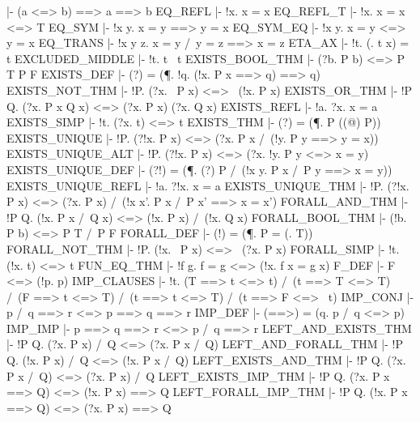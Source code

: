   |- (a <=> b) ==> a ==> b
\ENDTHEOREM
\THEOREM EQ\_REFL
  |- !x. x = x
\ENDTHEOREM
\THEOREM EQ\_REFL\_T
  |- !x. x = x <=> T
\ENDTHEOREM
\THEOREM EQ\_SYM
  |- !x y. x = y ==> y = x
\ENDTHEOREM
\THEOREM EQ\_SYM\_EQ
  |- !x y. x = y <=> y = x
\ENDTHEOREM
\THEOREM EQ\_TRANS
  |- !x y z. x = y /\ y = z ==> x = z
\ENDTHEOREM
\THEOREM ETA\_AX
  |- !t. (\x. t x) = t
\ENDTHEOREM
\THEOREM EXCLUDED\_MIDDLE
  |- !t. t \/ ~t
\ENDTHEOREM
\THEOREM EXISTS\_BOOL\_THM
  |- (?b. P b) <=> P T \/ P F
\ENDTHEOREM
\THEOREM EXISTS\_DEF
  |- (?) = (\P. !q. (!x. P x ==> q) ==> q)
\ENDTHEOREM
\THEOREM EXISTS\_NOT\_THM
  |- !P. (?x. ~P x) <=> ~(!x. P x)
\ENDTHEOREM
\THEOREM EXISTS\_OR\_THM
  |- !P Q. (?x. P x \/ Q x) <=> (?x. P x) \/ (?x. Q x)
\ENDTHEOREM
\THEOREM EXISTS\_REFL
  |- !a. ?x. x = a
\ENDTHEOREM
\THEOREM EXISTS\_SIMP
  |- !t. (?x. t) <=> t
\ENDTHEOREM
\THEOREM EXISTS\_THM
  |- (?) = (\P. P ((@) P))
\ENDTHEOREM
\THEOREM EXISTS\_UNIQUE
  |- !P. (?!x. P x) <=> (?x. P x /\ (!y. P y ==> y = x))
\ENDTHEOREM
\THEOREM EXISTS\_UNIQUE\_ALT
  |- !P. (?!x. P x) <=> (?x. !y. P y <=> x = y)
\ENDTHEOREM
\THEOREM EXISTS\_UNIQUE\_DEF
  |- (?!) = (\P. (?) P /\ (!x y. P x /\ P y ==> x = y))
\ENDTHEOREM
\THEOREM EXISTS\_UNIQUE\_REFL
  |- !a. ?!x. x = a
\ENDTHEOREM
\THEOREM EXISTS\_UNIQUE\_THM
  |- !P. (?!x. P x) <=> (?x. P x) /\ (!x x'. P x /\ P x' ==> x = x')
\ENDTHEOREM
\THEOREM FORALL\_AND\_THM
  |- !P Q. (!x. P x /\ Q x) <=> (!x. P x) /\ (!x. Q x)
\ENDTHEOREM
\THEOREM FORALL\_BOOL\_THM
  |- (!b. P b) <=> P T /\ P F
\ENDTHEOREM
\THEOREM FORALL\_DEF
  |- (!) = (\P. P = (\x. T))
\ENDTHEOREM
\THEOREM FORALL\_NOT\_THM
  |- !P. (!x. ~P x) <=> ~(?x. P x)
\ENDTHEOREM
\THEOREM FORALL\_SIMP
  |- !t. (!x. t) <=> t
\ENDTHEOREM
\THEOREM FUN\_EQ\_THM
  |- !f g. f = g <=> (!x. f x = g x)
\ENDTHEOREM
\THEOREM F\_DEF
  |- F <=> (!p. p)
\ENDTHEOREM
\THEOREM IMP\_CLAUSES
  |- !t. (T ==> t <=> t) /\
         (t ==> T <=> T) /\
         (F ==> t <=> T) /\
         (t ==> t <=> T) /\
         (t ==> F <=> ~t)
\ENDTHEOREM
\THEOREM IMP\_CONJ
  |- p /\ q ==> r <=> p ==> q ==> r
\ENDTHEOREM
\THEOREM IMP\_DEF
  |- (==>) = (\p q. p /\ q <=> p)
\ENDTHEOREM
\THEOREM IMP\_IMP
  |- p ==> q ==> r <=> p /\ q ==> r
\ENDTHEOREM
\THEOREM LEFT\_AND\_EXISTS\_THM
  |- !P Q. (?x. P x) /\ Q <=> (?x. P x /\ Q)
\ENDTHEOREM
\THEOREM LEFT\_AND\_FORALL\_THM
  |- !P Q. (!x. P x) /\ Q <=> (!x. P x /\ Q)
\ENDTHEOREM
\THEOREM LEFT\_EXISTS\_AND\_THM
  |- !P Q. (?x. P x /\ Q) <=> (?x. P x) /\ Q
\ENDTHEOREM
\THEOREM LEFT\_EXISTS\_IMP\_THM
  |- !P Q. (?x. P x ==> Q) <=> (!x. P x) ==> Q
\ENDTHEOREM
\THEOREM LEFT\_FORALL\_IMP\_THM
  |- !P Q. (!x. P x ==> Q) <=> (?x. P x) ==> Q
